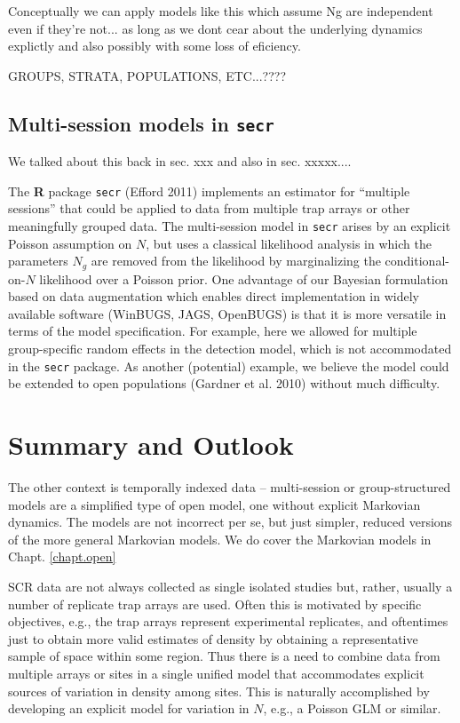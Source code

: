 Conceptually we can apply models like this which assume Ng are
independent even if they're not... as long as we dont cear about the
underlying dynamics explictly and also possibly with some loss of
eficiency. 

GROUPS, STRATA, POPULATIONS, ETC...????

\subsection{Multi-session models in \mbox{\tt secr}  }

We talked about this back in sec. xxx and also in sec. xxxxx....

The {\bf R} package \mbox{\tt secr} (Efford 2011) implements an
estimator for ``multiple sessions'' that could be applied to data from
multiple trap arrays or other meaningfully grouped data.
 The multi-session
model in \mbox{\tt secr} 
arises by an explicit Poisson assumption on $N$, but uses
 a classical likelihood analysis in which the parameters $N_{g}$
are removed from the likelihood by marginalizing the
conditional-on-$N$ likelihood over a Poisson prior.  One advantage of
our Bayesian formulation based on data augmentation which enables
direct implementation in widely available software (WinBUGS, JAGS,
OpenBUGS) is that it is more versatile in terms of the model
specification. For example, here we allowed for multiple
group-specific random effects in the detection model, which is not
accommodated in the \mbox{\tt secr}
package. As another (potential) example, we believe the model could be
extended to open populations (Gardner et al. 2010) without much
difficulty.


\section{Summary and Outlook}


The other context is temporally indexed data -- multi-session or
group-structured models are a simplified type of open model, one
without explicit Markovian dynamics. The models are not incorrect per
se, but just simpler, reduced versions of the more general Markovian
models. We do cover the Markovian models in Chapt. \ref{chapt.open}


SCR data are not
always collected as single isolated studies but, rather, usually a number of
replicate trap arrays are used. Often this is motivated by specific
objectives, e.g., the trap arrays represent experimental replicates,
and oftentimes just to obtain more valid estimates of density by
obtaining a representative sample of space within some region.  Thus
there is a need to combine data from multiple arrays or sites in a
single unified model that accommodates explicit sources of variation
in density among sites.  This is naturally accomplished by developing
an explicit model for variation in $N$, e.g., a Poisson GLM or
similar.

